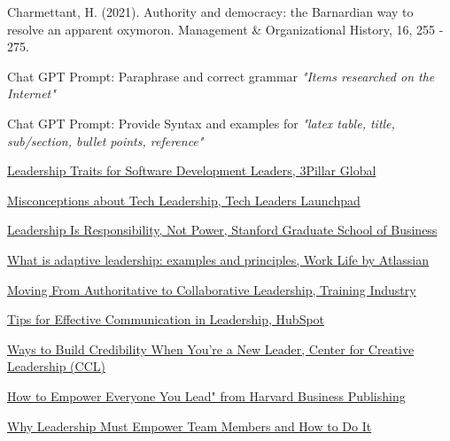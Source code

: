 \documentclass[runningheads]{llncs}
\begin{document}
\begin{thebibliography}{10}
Charmettant, H. (2021). Authority and democracy: the Barnardian way to resolve an apparent oxymoron. Management \& Organizational History, 16, 255 - 275.

Chat GPT Prompt: Paraphrase and correct grammar \textit{"Items researched on the Internet"}

Chat GPT Prompt: Provide Syntax and examples for \textit{"latex table, title, sub/section, bullet points, reference"}


\href{https://www.3pillarglobal.com/insights/10-leadership-traits-for-modern-software-development-leaders/}{Leadership Traits for Software Development Leaders, 3Pillar Global}

\href{https://techleaderslaunchpad.com/blog/7-misconceptions-about-tech-leadership}{Misconceptions about Tech Leadership, Tech Leaders Launchpad}

\href{https://www.gsb.stanford.edu/insights/leadership-responsibility-not-power}{Leadership Is Responsibility, Not Power, Stanford Graduate School of Business}

\href{https://www.atlassian.com/blog/leadership/adaptive-leadership}{What is adaptive leadership: examples and principles, Work Life by Atlassian}

\href{https://trainingindustry.com/articles/leadership/moving-from-authoritative-to-collaborative-leadership-benefits-and-best-practices-to-consider/#:~:text=1}{Moving From Authoritative to Collaborative Leadership, Training Industry}

\href{https://blog.hubspot.com/marketing/build-credibility-new-leader}{Tips for Effective Communication in Leadership, HubSpot}

\href{https://www.ccl.org/articles/leading-effectively-articles/communication-1-idea-3-facts-5-tips/}{Ways to Build Credibility When You're a New Leader, Center for Creative Leadership (CCL)}

\href{https://www.harvardbusiness.org/whoever-they-are-wherever-they-are-empowering-everyone-you-lead/#:~:text=The%20best%20leaders%20make%20the,getting%20to%20know%20your%20people}{How to Empower Everyone You Lead" from Harvard Business Publishing}

\href{https://johnmattone.com/blog/why-leadership-must-empower-team-members-and-how-to-do-it/#:~:text=Empowering%20team%20members%20leads%20to,action%20of%20the%20empowered%20team}{Why Leadership Must Empower Team Members and How to Do It}


\end{thebibliography}
\end{document}
